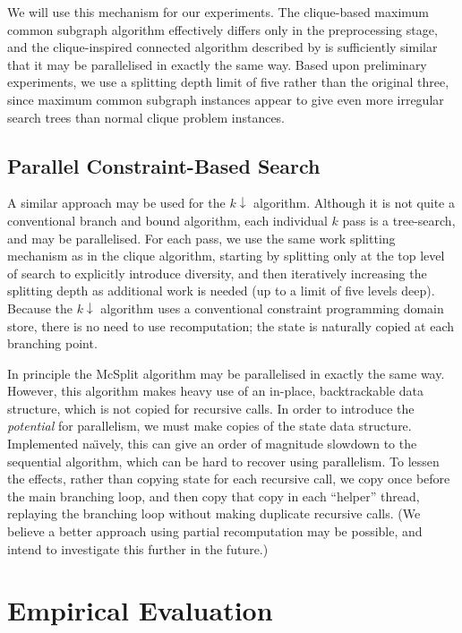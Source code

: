 \documentclass[sigconf]{acmart}
\begin{document}
We will use this mechanism for our experiments.  The clique-based maximum common subgraph algorithm
effectively differs only in the preprocessing stage, and the clique-inspired connected algorithm
described by \citet{DBLP:conf/cp/McCreeshNPS16} is sufficiently similar that it may be parallelised in
exactly the same way. Based upon preliminary experiments, we use a splitting depth limit of five
rather than the original three, since maximum common subgraph instances appear to give even more
irregular search trees than normal clique problem instances.

\subsection{Parallel Constraint-Based Search}

A similar approach may be used for the $k{\downarrow}$ algorithm. Although it is not quite a
conventional branch and bound algorithm, each individual $k$ pass is a tree-search, and may be
parallelised. For each pass, we use the same work splitting mechanism as in the clique algorithm,
starting by splitting only at the top level of search to explicitly introduce diversity, and then
iteratively increasing the splitting depth as additional work is needed (up to a limit of five
levels deep).  Because the $k{\downarrow}$ algorithm uses a conventional constraint programming
domain store, there is no need to use recomputation; the state is naturally copied at each branching
point.

In principle the McSplit algorithm may be parallelised in exactly the same way. However, this
algorithm makes heavy use of an in-place, backtrackable data structure, which is not copied for
recursive calls. In order to introduce the \emph{potential} for parallelism, we must make
copies of the state data structure. Implemented na{\"\i}vely, this can give an order of magnitude
slowdown to the sequential algorithm, which can be hard to recover using parallelism. To lessen the
effects, rather than copying state for each recursive call, we copy once before the main branching
loop, and then copy that copy in each ``helper'' thread, replaying the branching loop without making
duplicate recursive calls.  (We believe a better approach using partial recomputation may be
possible, and intend to investigate this further in the future.)

\section{Empirical Evaluation}
\end{document}
